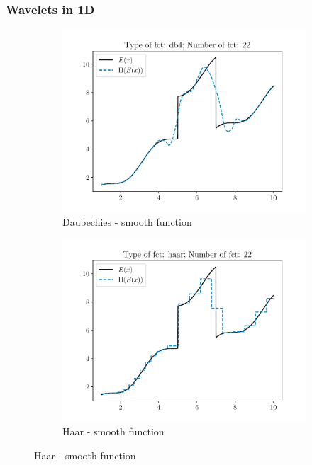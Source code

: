 \subsubsection{Wavelets in 1D}
\begin{figure}
\begin{subfigure}[t]{0.5\linewidth}
    \centering
    \includegraphics[width=\linewidth]{Figures/db4_N_22.pdf}
    \caption{Daubechies - smooth function}
\end{subfigure}
  \begin{subfigure}[t]{0.5\linewidth}
    \centering
    \includegraphics[width=\linewidth]{Figures/haar_N_22.pdf}
    \caption{Haar - smooth function}
\end{subfigure}  

\end{figure}
